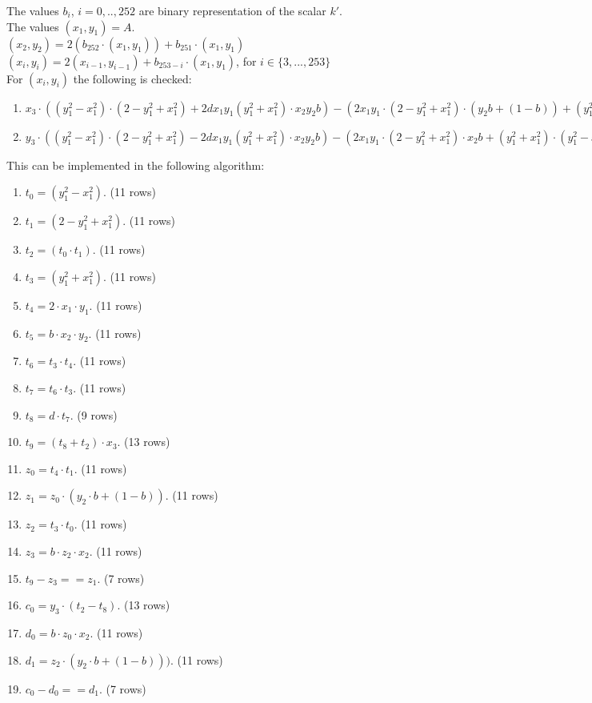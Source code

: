 The values $b_i$, $i = 0,.., 252$ are binary representation of the scalar $k'$.\\
The values $(x_1, y_1) = A$.\\
$(x_2, y_2) = 2 (b_{252} \cdot (x_1, y_1)) + b_{251} \cdot (x_1, y_1)$ \\
$(x_i, y_i) = 2 (x_{i - 1}, y_{i - 1}) + b_{253 - i} \cdot (x_1, y_1)$, for $i \in \{ 3,..., 253\}$ \\
For $(x_i, y_i)$ the following is checked:
\begin{enumerate}
    \item $x_3 \cdot ((y_1^2 - x_1^2)\cdot(2 - y_1^2 + x_1^2) + 2dx_1y_1(y_1^2+x_1^2) \cdot x_2y_2b ) - (2x_1y_1\cdot(2 - y_1^2 +x_1^2)\cdot (y_2b + (1 - b)) + (y_1^2 + x_1^2)\cdot(y_1^2 - x_1^2)\cdot x_2 b)$
    \item $y_3 \cdot ((y_1^2 - x_1^2)\cdot(2 - y_1^2 + x_1^2) - 2dx_1y_1(y_1^2+x_1^2) \cdot x_2y_2b ) - (2x_1y_1\cdot(2 - y_1^2 +x_1^2)\cdot x_2b + (y_1^2 + x_1^2)\cdot(y_1^2 - x_1^2)\cdot (y_2b + (1 - b)))$
\end{enumerate}
This can be implemented in the following algorithm:
\begin{enumerate}
\item $t_0 = (y_1^2 - x_1^2)$. (11 rows)
\item $t_1 = (2 - y_1^2 + x_1^2)$. (11 rows)
\item $t_2 = (t_0 \cdot t_1)$. (11 rows)
\item $t_3 = (y_1^2 + x_1^2)$. (11 rows)
\item $t_4 = 2 \cdot x_1 \cdot y_1$. (11 rows)
\item $t_5 = b \cdot x_2 \cdot y_2$. (11 rows)
\item $t_6 = t_3 \cdot t_4$. (11 rows)
\item $t_7 = t_6 \cdot t_3$. (11 rows)
\item $t_8 = d \cdot t_7$. (9 rows)
\item $t_9 = (t_8 + t_2) \cdot x_3$. (13 rows)
\item $z_0 = t_4 \cdot t_1$. (11 rows)
\item $z_1 = z_0 \cdot (y_2\cdot b + (1 - b))$. (11 rows)
\item $z_2 = t_3 \cdot t_0$. (11 rows)
\item $z_3 = b \cdot z_2 \cdot x_2$. (11 rows)
\item $t_9 - z_3 == z_1$. (7 rows)

\item $c_0 = y_3 \cdot (t_2 - t_8)$. (13 rows)
\item $d_0 = b \cdot z_0 \cdot x_2$. (11 rows)
\item $d_1 =  z_2 \cdot (y_2 \cdot b + (1-b)))$. (11 rows)
\item $c_0 - d_0 == d_1$. (7 rows)
\end{enumerate}

